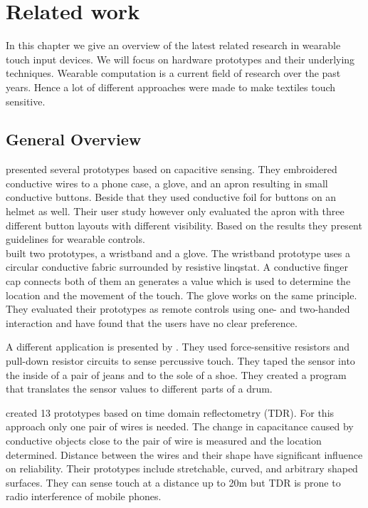 %

\chapter{Related work}
\label{relatedwork}
In this chapter we give an overview of the latest related research in wearable touch input devices. We will  focus on hardware prototypes and their underlying techniques. Wearable computation is a current field of research over the past years. Hence a lot of different approaches were made to make textiles touch sensitive.

\section{General Overview}
\cite{Holleis:2008:ECT:1409240.1409250} presented several prototypes based on capacitive sensing. They embroidered conductive wires to  a phone case, a glove, and an apron resulting in small conductive buttons. Beside that they used conductive foil for buttons on an helmet as well. Their user study however only evaluated the apron with three different button layouts with different visibility. Based on the results they present guidelines for wearable controls. \\

\cite{Speir:2014:WRC:2628363.2634221} built two prototypes, a wristband and a glove. The wristband prototype uses a circular conductive fabric surrounded by resistive linqstat. A conductive finger cap connects both of them an generates a value which is used to determine the location and the movement of the touch. The glove works on the same principle. They evaluated their prototypes as remote controls using one- and two-handed interaction and have found that the users have no clear preference. 

 A different application is presented by \cite{Smus:2010:UDT:1753846.1754094}. They used force-sensitive resistors and pull-down resistor circuits to sense percussive touch. They taped the sensor into the inside of a pair of jeans and to the sole of a shoe. They created a program that translates the sensor values to different parts of a drum. 

\citep{Wimmer:2011:MDT:2047196.2047264} created 13 prototypes based on time domain reflectometry (TDR). For this approach only one pair of wires is needed. The change in capacitance caused by conductive objects close to the pair of wire is measured and the location determined. Distance between the wires and their shape have significant influence on reliability. Their prototypes include stretchable, curved, and arbitrary shaped surfaces. They can sense touch at a distance up to 20m but TDR is prone to radio interference of mobile phones. 

